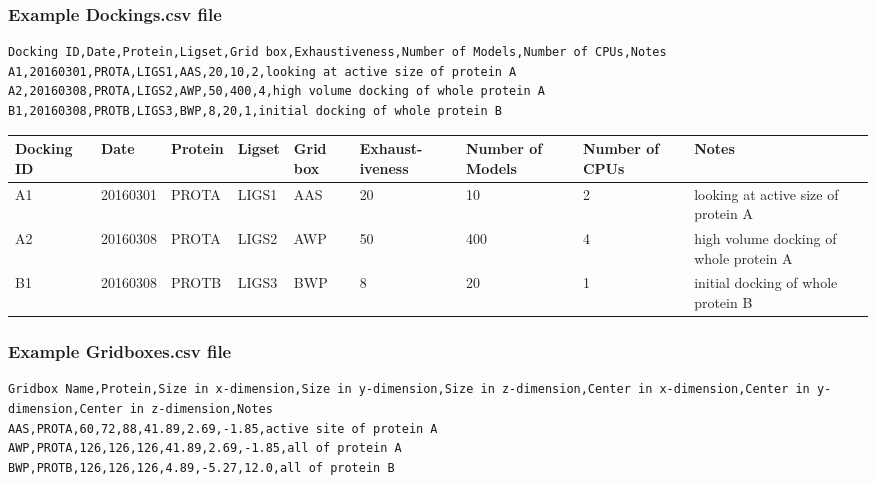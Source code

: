 \subsubsection{Example Dockings.csv file}

\begin{lstlisting}
Docking ID,Date,Protein,Ligset,Grid box,Exhaustiveness,Number of Models,Number of CPUs,Notes
A1,20160301,PROTA,LIGS1,AAS,20,10,2,looking at active size of protein A
A2,20160308,PROTA,LIGS2,AWP,50,400,4,high volume docking of whole protein A
B1,20160308,PROTB,LIGS3,BWP,8,20,1,initial docking of whole protein B
\end{lstlisting}

\begin{table}[h]\scriptsize
	\label{tab:dockings.csv}
		\begin{tabular}
		{|p{1.23cm}|l|l|l|p{.73cm}|p{1.37cm}|p{1.5cm}|p{1.28cm}|p{1.6cm}|}
			\hline
			\textbf{Docking ID} & \textbf{Date} & \textbf{Protein} & \textbf{Ligset} & \textbf{Grid box} & \textbf{Exhaust-iveness} & \textbf{Number of Models} & \textbf{Number of CPUs} & \textbf{Notes} \\
			\hline
			\hline
			A1 & 20160301 & PROTA & LIGS1 & AAS & 20 & 10 & 2 & looking at active size of protein A \\
			\hline
			A2 & 20160308 & PROTA & LIGS2 & AWP & 50 & 400 & 4 & high volume docking of whole protein A \\
			\hline
			B1 & 20160308 & PROTB & LIGS3 & BWP & 8 & 20 & 1 & initial docking of whole protein B \\
			\hline
		\end{tabular}
\end{table}


\subsubsection{Example Gridboxes.csv file}

\begin{lstlisting}
Gridbox Name,Protein,Size in x-dimension,Size in y-dimension,Size in z-dimension,Center in x-dimension,Center in y-dimension,Center in z-dimension,Notes
AAS,PROTA,60,72,88,41.89,2.69,-1.85,active site of protein A
AWP,PROTA,126,126,126,41.89,2.69,-1.85,all of protein A
BWP,PROTB,126,126,126,4.89,-5.27,12.0,all of protein B
\end{lstlisting}

